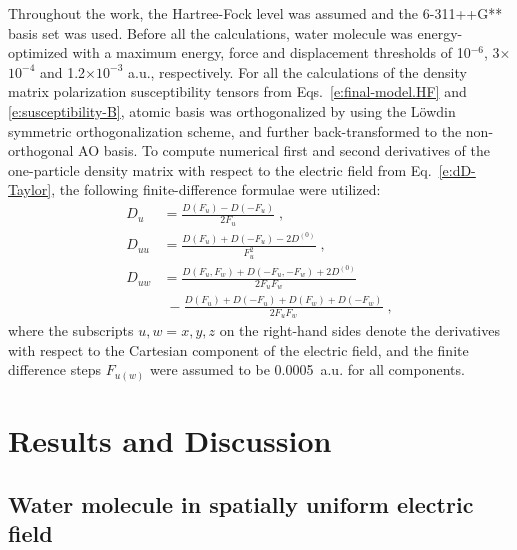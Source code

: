 \documentclass[aip,jcp,preprint,amsmath,amssymb,floatfix]{revtex4-1}
\begin{document}
%
Throughout the work, the Hartree\hyp{}Fock level\cite{Roothaan.RevModPhys.1951} was assumed 
and the 6-311++G** basis set\cite{Krishnan.Binkley.Seeger.Pople.JCP.1980}
was used. Before all the calculations, water molecule was energy\hyp{}optimized
with a maximum energy, force and displacement thresholds of 10$^{-6}$, 3$\times$$10^{-4}$ 
and 1.2$\times$$10^{-3}$ a.u., respectively.
For all the calculations of the density matrix polarization susceptibility tensors
from Eqs.~\eqref{e:final-model.HF} and \eqref{e:susceptibility-B}, 
atomic basis was orthogonalized by using the L{\"o}wdin symmetric orthogonalization scheme,\cite{Mayer.IJQC.2002}
and further back\hyp{}transformed to the non\hyp{}orthogonal AO basis.
To compute numerical first and second derivatives of the one\hyp{}particle density matrix
with respect to the electric field from Eq.~\eqref{e:dD-Taylor}, 
the following finite\hyp{}difference formulae were utilized:
%
\begin{subequations}\label{e:ff}
  \begin{align}
    D_u    &= \frac{D(F_u) - D(-F_u)}{2F_u} \;,\\
    D_{uu} &= \frac{D(F_u) + D(-F_u) - 2D^{(0)}}{F_u^2} \;,\\
    D_{uw} &= \frac{D(F_u,F_w) + D(-F_u,-F_w) + 2D^{(0)}}{2F_uF_w} \nonumber \\ 
           & \; -\frac{D(F_u) + D(-F_u) + D(F_w) + D(-F_w)}{2F_uF_w} \;,
  \end{align}
\end{subequations}
%
where 
the subscripts $u,w=x,y,z$ on the right\hyp{}hand sides denote the derivatives with respect 
to the Cartesian component of the electric field, and the finite difference
steps $F_{u(w)}$ were assumed to be 0.0005~a.u. for all components. 

\section{\label{s:4}Results and Discussion}

\subsection{\label{ss:41}Water molecule in spatially uniform electric field}
\end{document}
